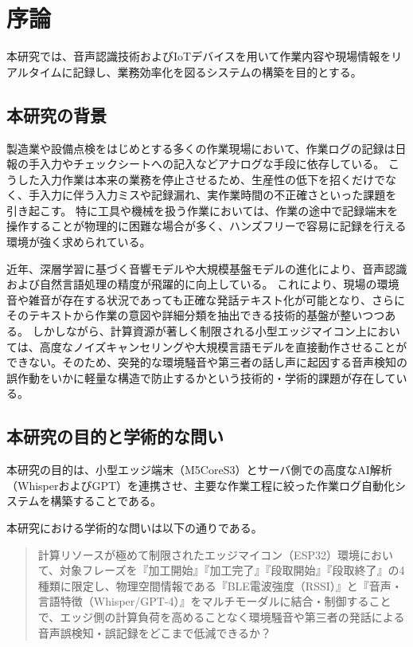 \documentclass[a4paper,12pt,ja=standard,lualatex]{bxjsarticle}
\begin{document}
\newpage

\tableofcontents
\newpage
\setcounter{page}{1}
\pagestyle{plain}

\section{序論}\label{sec1}
本研究では、音声認識技術およびIoTデバイスを用いて作業内容や現場情報をリアルタイムに記録し、業務効率化を図るシステムの構築を目的とする。

\subsection{本研究の背景}
製造業や設備点検をはじめとする多くの作業現場において、作業ログの記録は日報の手入力やチェックシートへの記入などアナログな手段に依存している。
こうした入力作業は本来の業務を停止させるため、生産性の低下を招くだけでなく、手入力に伴う入力ミスや記録漏れ、実作業時間の不正確さといった課題を引き起こす。
特に工具や機械を扱う作業においては、作業の途中で記録端末を操作することが物理的に困難な場合が多く、ハンズフリーで容易に記録を行える環境が強く求められている。

近年、深層学習に基づく音響モデルや大規模基盤モデルの進化により、音声認識および自然言語処理の精度が飛躍的に向上している。
これにより、現場の環境音や雑音が存在する状況であっても正確な発話テキスト化が可能となり、さらにそのテキストから作業の意図や詳細分類を抽出できる技術的基盤が整いつつある。
しかしながら、計算資源が著しく制限される小型エッジマイコン上においては、高度なノイズキャンセリングや大規模言語モデルを直接動作させることができない。そのため、突発的な環境騒音や第三者の話し声に起因する音声検知の誤作動をいかに軽量な構造で防止するかという技術的・学術的課題が存在している。

\subsection{本研究の目的と学術的な問い}
本研究の目的は、小型エッジ端末（M5CoreS3）とサーバ側での高度なAI解析（WhisperおよびGPT）を連携させ、主要な作業工程に絞った作業ログ自動化システムを構築することである。

本研究における学術的な問いは以下の通りである。
\begin{quote}
計算リソースが極めて制限されたエッジマイコン（ESP32）環境において、対象フレーズを『加工開始』『加工完了』『段取開始』『段取終了』の4種類に限定し、物理空間情報である『BLE電波強度（RSSI）』と『音声・言語特徴（Whisper/GPT-4）』をマルチモーダルに結合・制御することで、エッジ側の計算負荷を高めることなく環境騒音や第三者の発話による音声誤検知・誤記録をどこまで低減できるか？
\end{quote}
\end{document}
